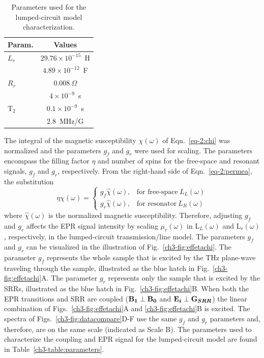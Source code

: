 \begin{table}[hbtp]
\centering
\caption{Parameters used for the lumped-circuit model characterization.}
\begin{tabular}{l|c}
\multicolumn{1}{l|}{Param.} & \multicolumn{1}{c}{Values} \\ \hline \hline
\multicolumn{1}{l|}{$L_r$} & \multicolumn{1}{c}{$29.76\times 10^{-15}$~H} \\
\rowcolor[rgb]{0.937,0.937,0.937}  
\multicolumn{1}{l|}{$C_r$} & \multicolumn{1}{c}{$4.89\times 10^{-12} $~F} \\
\multicolumn{1}{l|}{$R_r$} & \multicolumn{1}{c}{$0.008~\Omega$} \\
\rowcolor[rgb]{0.937,0.937,0.937}  
\multicolumn{1}{l|}{T$_1$} & \multicolumn{1}{c}{$4\times 10^{-9}$~s} \\
\multicolumn{1}{l|}{T$_2$} & \multicolumn{1}{c}{$0.1\times 10^{-9}$~s} \\
\rowcolor[rgb]{0.937,0.937,0.937}  
\multicolumn{1}{l|}{$\gamma$} & \multicolumn{1}{c}{$2.8$~MHz/G}
\end{tabular}\label{ch3-table:lumpedparameters}
\end{table}

The integral of the magnetic susceptibility $\chi(\omega)$ of Eqn.~\ref{eq-2:chi} was normalized and the parameters $g_f$ and $g_r$ were used for scaling. The parameters encompass the filling factor $\eta$ and number of spins for the free-space and resonant signals, $g_f$ and $g_r$, respectively. From the right-hand side of Eqn.~\ref{eq-2:permea}, the substitution
\begin{equation}
    \eta \chi(\omega) =
    \begin{cases}
      g_f \hat{\chi}(\omega), & \text{for free-space}\ L_L(\omega) \\
      g_r \hat{\chi}(\omega), & \text{for resonator}\ L_R(\omega)
    \end{cases}
\end{equation}\label{etagfgr}
where $\hat{\chi}(\omega)$ is the normalized magnetic susceptibility. Therefore, adjusting  $g_f$ and $g_r$ affects the EPR signal intensity by scaling $\mu_r(\omega)$ in L$_L(\omega)$ and L$_r(\omega)$, respectively, in the lumped-circuit transmission\-/line model. The parameters $g_f$ and $g_r$ can be visualized in the illustration of Fig.~\ref{ch3-fig:effetachi}. The parameter $g_f$ represents the whole sample that is excited by the THz plane-wave traveling through the sample, illustrated as the blue hatch in Fig.~\ref{ch3-fig:effetachi}A. The parameter $g_r$ represents only the sample that is excited by the SRRs, illustrated as the blue hatch in Fig.~\ref{ch3-fig:effetachi}B. When both the EPR transitions and SRR are coupled ($\textbf{B}\boldsymbol{_{1}}\perp\textbf{B}\boldsymbol{_{0}}$ and $\textbf{E}\boldsymbol{_{i}}\perp\textbf{G}\boldsymbol{_{SRR}}$) the linear combination of Figs.~\ref{ch3-fig:effetachi}A and \ref{ch3-fig:effetachi}B is excited. The spectra of Figs.~\ref{ch3-fig:datacompare}D-F use the same $g_f$ and $g_r$ parameters and, therefore, are on the same scale (indicated as Scale B). The parameters used to characterize the coupling and EPR signal for the lumped-circuit model are found in Table~\ref{ch3-table:parameters}.

